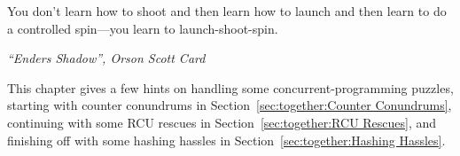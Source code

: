 

\epigraph{You don't learn how to shoot and then learn how to launch
	  and then learn to do a controlled spin---you learn to
	  launch-shoot-spin.}{\emph{``Enders Shadow'', Orson Scott Card}}


This chapter gives a few hints on handling some concurrent-programming
puzzles, starting with counter conundrums in
Section~\ref{sec:together:Counter Conundrums},
continuing with some RCU rescues in
Section~\ref{sec:together:RCU Rescues},
and finishing off with some hashing hassles in
Section~\ref{sec:together:Hashing Hassles}.




